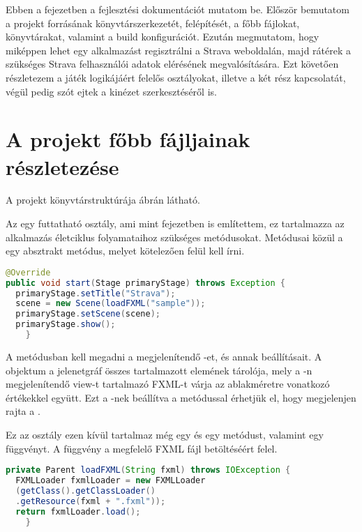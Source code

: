 Ebben a fejezetben a fejlesztési dokumentációt mutatom be.
Először bemutatom a projekt forrásának könyvtárszerkezetét, felépítését, a főbb fájlokat, könyvtárakat, valamint a build konfigurációt.
Ezután megmutatom, hogy miképpen lehet egy alkalmazást regisztrálni a Strava weboldalán, majd rátérek  a szükséges Strava felhasználói adatok elérésének megvalósítására.
Ezt követően részletezem a játék logikájáért felelős osztályokat, illetve a két rész kapcsolatát, végül pedig szót ejtek a kinézet szerkesztéséről is.

\section{A projekt főbb fájljainak részletezése}\label{fobbFajlok}


A projekt könyvtárstruktúrája  ábrán látható.


Az  egy futtatható osztály, ami mint  fejezetben is említettem, ez tartalmazza az alkalmazás életciklus folyamataihoz szükséges metódusokat.
Metódusai közül a  egy absztrakt metódus, melyet kötelezően felül kell írni.


\begin{lstlisting}[language=Java]
@Override
public void start(Stage primaryStage) throws Exception {
  primaryStage.setTitle("Strava");
  scene = new Scene(loadFXML("sample"));
  primaryStage.setScene(scene);
  primaryStage.show();
    }
\end{lstlisting}
 
A  metódusban kell megadni a megjelenítendő -et, és annak beállításait.
A  objektum a jelenetgráf összes tartalmazott elemének tárolója, mely a -n megjelenítendő view-t tartalmazó FXML-t várja az ablakméretre vonatkozó értékekkel együtt.
Ezt a -nek beállítva a  metódussal érhetjük el, hogy megjelenjen rajta a .

Ez az osztály ezen kívül tartalmaz még egy  és egy  metódust, valamint egy  függvényt.
A  függvény a megfelelő FXML fájl betöltéséért felel.

\begin{lstlisting}[language=Java]
private Parent loadFXML(String fxml) throws IOException {
  FXMLLoader fxmlLoader = new FXMLLoader
  (getClass().getClassLoader()
  .getResource(fxml + ".fxml"));
  return fxmlLoader.load();
    } 
\end{lstlisting}
 
